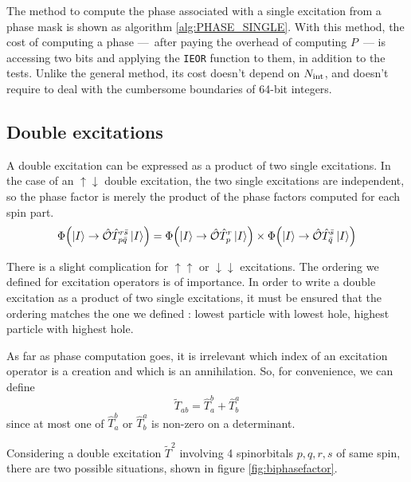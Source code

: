 \documentclass[./thesis.tex]{subfiles}
\begin{document}
The method to compute the phase associated with a single excitation from a phase mask is shown as algorithm \ref{alg:PHASE_SINGLE}.
With this method, the cost of computing a phase ---~after paying the overhead of computing $P$~--- is accessing two bits and applying the \lstinline{IEOR} function to them, in addition to the tests. Unlike the general method, its cost doesn't depend on ${N_\text{int}}$, and doesn't require to deal with the cumbersome boundaries of 64-bit integers.\phantom{\ref{alg:EXC_DEGREE}}


\subsection{Double excitations}


A double excitation can be expressed as a product of two single excitations.
In the case of an $\uparrow \downarrow$ double excitation, the two single excitations are independent, so the phase factor is merely the product of the phase factors computed for each spin part. 
\begin{equation}
{\Phi \qty(\ket{I} \rightarrow {\hat{\mathcal{O}}}{\hat{T}_{p \bar q}^{r \bar s}} \ket{I})} = 
{\Phi \qty(\ket{I} \rightarrow {\hat{\mathcal{O}}} {\hat{T}_{p}^{r}} \ket{I})} \times
{\Phi \qty(\ket{I} \rightarrow {\hat{\mathcal{O}}}{\hat{T}_{\bar q}^{\bar s}} \ket{I})} 
\end{equation}


There is a slight complication for $\uparrow \uparrow$ or $\downarrow \downarrow$ excitations. The ordering we defined for excitation operators is of importance. In order to write a double excitation as a product of two single excitations, it must be ensured that the ordering matches the one we defined : lowest particle with lowest hole, highest particle with highest hole.

As far as phase computation goes, it is irrelevant which index of an excitation operator is a creation and which is an annihilation. So, for convenience, we can define
\begin{equation}
\tilde T_{ab} = \hat T_a^b + \hat T_b^a
\end{equation}
since at most one of $\hat T_a^b$ or $\hat T_b^a$ is non-zero on a determinant.


Considering a double excitation $\tilde T^2$ involving 4 spinorbitals $p,q,r,s$ of same spin, there are two possible situations, shown in figure \ref{fig:biphasefactor}. 
\end{document}
